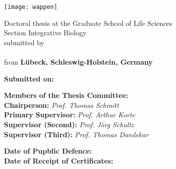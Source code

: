 \documentclass[
12pt, %
english, %
doublespacing, %
headsepline, %
chapterinoneline, %
]{MastersDoctoralThesis} %
\author{Jan Alexander \textsc{Freudenthal}} %
\begin{document}
 
\frontmatter %

\pagestyle{plain} 


\begin{titlepage}
  \begin{center}
    {\scshape\LARGE
       \univname\par}\vspace{1.0cm}
    \texttt{[image: wappen]}
    \vspace{1.0cm}
    
    {\color{mdtRed}\LARGE \ttitle\par}
    \vspace{1.0cm}
    
    Doctoral thesis at the Graduate School of Life Sciences \\
    Section Integrative Biology \\
    submitted by \\
    \vspace{1.0cm}
    \color{mdtRed}{\LARGE\authorname} \\
    \vspace{1.0cm}
    \color{black}from
    \textbf{L\"{u}beck, Schleswig-Holstein, Germany}
    
    
  \end{center}
  \newpage
  
  \vspace{.1\textheight}
  \textbf{Submitted on:} \dotfill\\
  
  \vspace{.1\textheight}
  \begin{centering}
    {\Large\textbf{Members of the Thesis Committee:}} \\
      \vspace{.1\textheight}
      {\Large
      \textbf{Chairperson: }\textit{Prof. Thomas Schmitt} \\
      \textbf{Primary Supervisor: }\textit{Prof. Arthur Korte} \\
      \textbf{Supervisor (Second):  }\textit{Prof. J\"{o}rg Schultz } \\
      \textbf{Supervisor (Third):  }\textit{Prof. Thomas Dandekar} \\
      }
    \end{centering}
    \vspace{0.2\textheight}
    \noindent
    \textbf{Date of Pupblic Defence:} \dotfill \\
    \textbf{Date of Receipt of Certificates:}\dotfill
  
  
\end{titlepage}
\end{document}
